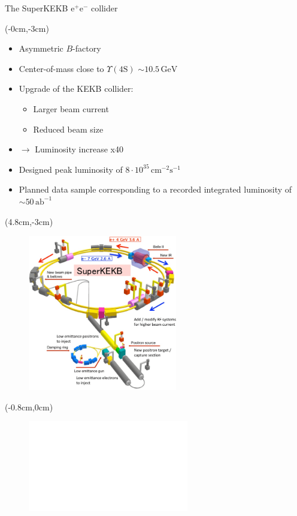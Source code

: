 \documentclass[8pt]{beamer}
\begin{document}
\begin{frame}{The SuperKEKB $\textrm{e}^+\textrm{e}^-$ collider}



\begin{textblock*}{4.5cm}(-0cm,-3cm)
	\begin{center}	
		\begin{itemize}
			\item Asymmetric $B$-factory
			\item Center-of-mass close to $\Upsilon(4\textrm{S})$ $\sim 10.5\,\textrm{GeV}$
			\item Upgrade of the KEKB collider:
			\begin{itemize}
				\item Larger beam current
				\item Reduced beam size
			\end{itemize}
		
		
		\item<3> $\rightarrow$ Luminosity increase x40
		\item<3> Designed peak luminosity of $8\cdot 10^{35}\,\textrm{cm}^{-2}\textrm{s}^{-1}$
		\item<3> Planned data sample corresponding to a recorded integrated luminosity of $\sim 50\,\textrm{ab}^{-1}$
		
		
		\end{itemize}
	\end{center}
	
\end{textblock*}


\begin{textblock*}{7cm}(4.8cm,-3cm)
	\begin{figure}
		\includegraphics[width=6.5cm]{VBilder/SuperKEKB}
	\end{figure}
	
	
\end{textblock*}

\begin{textblock*}{7cm}(-0.8cm,0cm)
	\begin{figure}
		\includegraphics<2>[width=7cm]{VBilder/Beamsize.pdf}
	\end{figure}
	
	
\end{textblock*}




\end{frame}
\end{document}
